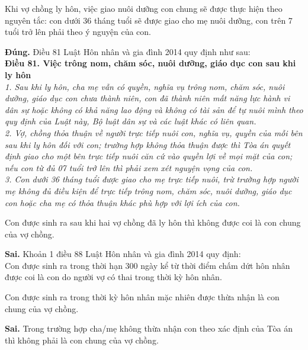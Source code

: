 \begin{ques}
Khi vợ chồng ly hôn, việc giao nuôi dưỡng con chung sẽ được thực hiện theo nguyên tắc: con dưới 36 tháng tuổi sẽ được giao cho mẹ nuôi dưỡng, con trên 7 tuổi trở lên phải theo ý nguyện của con.
\end{ques}
\begin{ans}
\textbf{Đúng.} Điều 81 Luật Hôn nhân và gia đình 2014 quy định như sau:\\
\textbf{Điều 81. Việc trông nom, chăm sóc, nuôi dưỡng, giáo dục con sau khi ly hôn}\\
\textit{1. Sau khi ly hôn, cha mẹ vẫn có quyền, nghĩa vụ trông nom, chăm sóc, nuôi dưỡng, giáo dục con chưa thành niên, con đã thành niên mất năng lực hành vi dân sự hoặc không có khả năng lao động và không có tài sản để tự nuôi mình theo quy định của Luật này, Bộ luật dân sự và các luật khác có liên quan.\\
2. Vợ, chồng thỏa thuận về người trực tiếp nuôi con, nghĩa vụ, quyền của mỗi bên sau khi ly hôn đối với con; trường hợp không thỏa thuận được thì Tòa án quyết định giao cho một bên trực tiếp nuôi căn cứ vào quyền lợi về mọi mặt của con; nếu con từ đủ 07 tuổi trở lên thì phải xem xét nguyện vọng của con.\\
3. Con dưới 36 tháng tuổi được giao cho mẹ trực tiếp nuôi, trừ trường hợp người mẹ không đủ điều kiện để trực tiếp trông nom, chăm sóc, nuôi dưỡng, giáo dục con hoặc cha mẹ có thỏa thuận khác phù hợp với lợi ích của con.}
\end{ans}

\begin{ques}
Con được sinh ra sau khi hai vợ chồng đã ly hôn thì không được coi là con chung của vợ chồng.
\end{ques}
\begin{ans}
\textbf{Sai.} Khoản 1 điều 88 Luật Hôn nhân và gia đình 2014 quy định:\\
Con được sinh ra trong thời hạn 300 ngày kể từ thời điểm chấm dứt hôn nhân được coi là con do người vợ có thai trong thời kỳ hôn nhân.
\end{ans}

\begin{ques}
Con được sinh ra trong thời kỳ hôn nhân mặc nhiên được thừa nhận là con chung của vợ chồng.
\end{ques}
\begin{ans}
\textbf{Sai.} Trong trường hợp cha/mẹ không thừa nhận con theo xác định của Tòa án thì không phải là con chung của vợ chồng.
\end{ans}